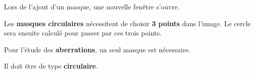 \bigskip

Lors de l'ajout d'un masque, une nouvelle fenêtre s'ouvre.

Les \textbf{masques circulaires} nécessitent de choisir \textbf{3 points} dans l'image. Le cercle sera ensuite calculé pour passer par ces trois points.


\begin{tcolorbox}[myboxstyle]
\begin{large}
\begin{center}
Pour l'étude des \textbf{aberrations}, un seul masque est nécessaire. 

Il doit être de type \textbf{circulaire}.
\end{center}
\end{large}
\end{tcolorbox}

